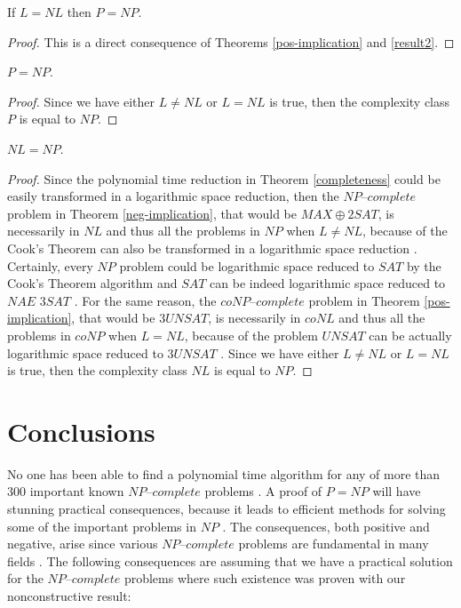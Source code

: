 \documentclass[a4paper,UKenglish,cleveref, autoref]{lipics-v2019}
\begin{document}
\begin{theorem}
If $L = NL$ then $P = NP$.
\end{theorem}

\begin{proof}
This is a direct consequence of Theorems \ref{pos-implication} and \ref{result2}.
\end{proof}

\begin{theorem}
$P = NP$.
\end{theorem}

\begin{proof}
Since we have either $L \neq NL$ or $L = NL$ is true, then the complexity class $P$ is equal to $NP$.
\end{proof}

\begin{theorem}
$NL = NP$.
\end{theorem}

\begin{proof}
Since the polynomial time reduction in Theorem \ref{completeness} could be easily transformed in a logarithmic space reduction, then the $\textit{NP--complete}$ problem in Theorem \ref{neg-implication}, that would be $MAX\oplus2SAT$, is necessarily in $NL$ and thus all the problems in $NP$ when $L \neq NL$, because of the Cook's Theorem can also be transformed in a logarithmic space reduction \cite{GJ79}. Certainly, every $NP$ problem could be logarithmic space reduced to $SAT$ by the Cook's Theorem algorithm and $SAT$ can be indeed logarithmic space reduced to $\textit{NAE 3SAT}$ \cite{GJ79}. For the same reason, the $\textit{coNP--complete}$ problem in Theorem \ref{pos-implication}, that would be $3UNSAT$, is necessarily in $coNL$ and thus all the problems in $coNP$ when $L = NL$, because of the problem $UNSAT$ can be actually logarithmic space reduced to $3UNSAT$ \cite{GJ79}. Since we have either $L \neq NL$ or $L = NL$ is true, then the complexity class $NL$ is equal to $NP$.
\end{proof}

\section{Conclusions}

No one has been able to find a polynomial time algorithm for any of more than $300$ important known $\textit{NP--complete}$ problems \cite{GJ79}. A proof of $P = NP$ will have stunning practical consequences, because it leads to efficient methods for solving some of the important problems in $NP$ \cite{CS00}. The consequences, both positive and negative, arise since various $\textit{NP--complete}$ problems are fundamental in many fields \cite{CS00}. The following consequences are assuming that we have a practical solution for the $\textit{NP--complete}$ problems where such existence was proven with our nonconstructive result:
\end{document}
